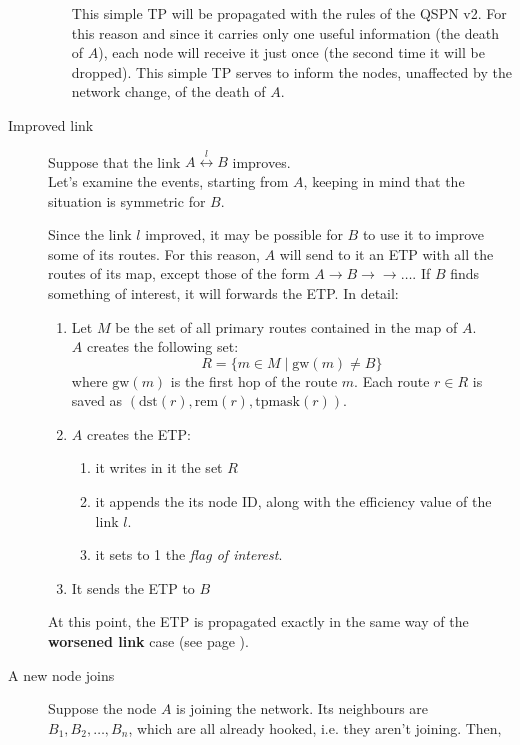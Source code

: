 \documentclass[a4paper]{article}
\newcommand{\T}[1]{\textrm{#1}}
\begin{document}
\begin{description}
\begin{enumerate}
				This simple TP will be propagated with the
				rules of the QSPN v2. For this reason and since it carries
				only one useful information (the death of
				$A$), each node will receive it just once (the
				second time it will be dropped). This simple
				TP serves to inform the nodes, unaffected
				by the network change, of the death of $A$.
		\end{enumerate}
	\item[Improved link]
	\label{ilink}
		Suppose that the link $A
		\stackrel{l}{\leftrightarrow} B$ improves.\\
		Let's examine the events, starting from $A$, keeping in mind
		that the situation is symmetric for $B$.

		Since the link $l$ improved, it may be possible for $B$ to use
		it to improve some of its routes. For this reason, $A$ will
		send to it an ETP with all the routes of its map, except those of the form
		$A\rightarrow B\rightarrow \rightarrow \dots$. If $B$ finds
		something of interest, it will forwards the ETP. In detail:
		\begin{enumerate}
			\item Let $M$ be the set of all primary routes
				contained in the map of $A$.\\
			      $A$ creates the following set:
			      \[
			      R=\{m\in M\;|\; \T{gw}(m)\neq B\}
			      \]
			      where $\T{gw}(m)$ is the first hop of the route
			      $m$. 
			      Each route $r\in R$ is saved as $(\T{dst}(r),
			      \T{rem}(r), \T{tpmask}(r))$.
		      \item $A$ creates the ETP:
			\begin{enumerate}
				\item it writes in it the set $R$
				\item it appends the its node ID, along with the efficiency
					value of the link $l$.
				\item it sets to 1 the \emph{flag of interest}.
			\end{enumerate}
		      \item It sends the ETP to $B$
		\end{enumerate}
		At this point, the ETP is propagated exactly in the same way
		of the \textbf{worsened link} case (see page \pageref{wlink}).
	\item[A new node joins]
		Suppose the node $A$ is joining the network. Its neighbours
		are $B_1, B_2,\dots, B_n$, which are all already hooked, i.e.
		they aren't joining. Then,
		\begin{enumerate}

\end{enumerate}
\end{description}
\end{document}
